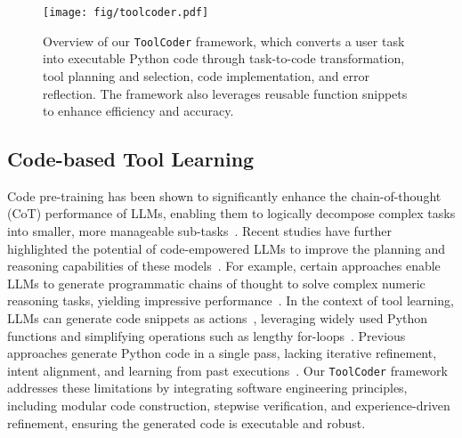 \begin{figure*}[t]
    \centering
    \texttt{[image: fig/toolcoder.pdf]}
    \caption{Overview of our \texttt{ToolCoder} framework, which converts a user task into executable Python code through task-to-code transformation, tool planning and selection, code implementation, and error reflection. The framework also leverages reusable function snippets to enhance efficiency and accuracy.}
    \label{fig:overview}
    \vspace{-0.5cm}
\end{figure*}

\subsection{Code-based Tool Learning}
Code pre-training has been shown to significantly enhance the chain-of-thought (CoT) performance of LLMs, enabling them to logically decompose complex tasks into smaller, more manageable sub-tasks~\cite{lyu-etal-2023-faithful,DBLP:conf/iclr/ChengX0LNHXROZS23,DBLP:conf/sigir/YeHYLHL23}. Recent studies have further highlighted the potential of code-empowered LLMs to improve the planning and reasoning capabilities of these models~\cite{DBLP:journals/corr/abs-2401-00812,DBLP:journals/tmlr/ChenM0C23,DBLP:conf/icml/GaoMZ00YCN23}. For example, certain approaches enable LLMs to generate programmatic chains of thought to solve complex numeric reasoning tasks, yielding impressive performance~\cite{DBLP:journals/tmlr/ChenM0C23,DBLP:conf/icml/GaoMZ00YCN23}. In the context of tool learning, LLMs can generate code snippets as actions~\cite{DBLP:conf/icml/WangCY0L0J24}, leveraging widely used Python functions and simplifying operations such as lengthy for-loops~\cite{DBLP:journals/corr/abs-2405-16533}.
Previous approaches generate Python code in a single pass, lacking iterative refinement, intent alignment, and learning from past executions~\cite{DBLP:journals/corr/abs-2308-00675,DBLP:journals/corr/abs-2401-06201,DBLP:conf/icml/WangCY0L0J24}. Our \texttt{ToolCoder} framework addresses these limitations by integrating software engineering principles, including modular code construction, stepwise verification, and experience-driven refinement, ensuring the generated code is executable and robust.

